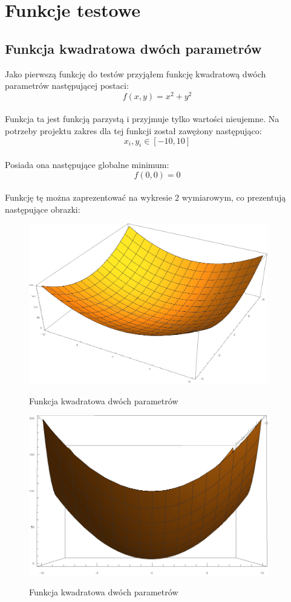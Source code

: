 \documentclass[twoside]{projektInzynierskiMS1}
\newcommand{\si}{ś}
\begin{document}
\section{Funkcje testowe}
	\subsection{Funkcja kwadratowa dwóch parametrów}
	Jako pierwszą funkcję do testów przyjąłem funkcję kwadratową dwóch parametrów następującej postaci:
\[f(x, y) = x^2 + y^2 \] \\

Funkcja ta jest funkcją parzystą i przyjmuje tylko warto\si ci nieujemne. Na potrzeby projektu zakres dla tej funkcji został zawężony następująco:
\[x_i, y_i \in [-10, 10] \] \\

Posiada ona następujące globalne minimum:
\[ f(0, 0) = 0 \] \\

Funkcję tę można zaprezentować na wykresie 2 wymiarowym, co prezentują następujące obrazki:\\
\begin{figure}[H]
	\begin{center}
		\includegraphics[height=7cm]{quadraticFunction1.png}\\
	\end{center}
	\caption{Funkcja kwadratowa dwóch parametrów}
\end{figure}
\begin{figure}[H]
	\begin{center}
		\includegraphics[height=7cm]{quadraticFunction2.png}\\
	\end{center}
	\caption{Funkcja kwadratowa dwóch parametrów}
\end{figure}
\end{document}
